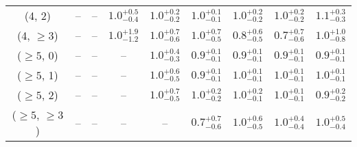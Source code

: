 \begin{table}[h!]
{\begin{tabular}{ccccccccc}
	(4, 2) & -- & -- & $1.0^{+ 0.5 }_{- 0.4 }$ & $1.0^{+ 0.2 }_{- 0.2 }$ & $1.0^{+ 0.1 }_{- 0.1 }$ & $1.0^{+ 0.2 }_{- 0.2 }$ & $1.0^{+ 0.2 }_{- 0.2 }$ & $1.1^{+ 0.3 }_{- 0.3 }$ \\[0.5ex] 
	(4, $\ge3$) & -- & -- & $1.0^{+ 1.9 }_{- 1.2 }$ & $1.0^{+ 0.7 }_{- 0.6 }$ & $1.0^{+ 0.7 }_{- 0.5 }$ & $0.8^{+ 0.6 }_{- 0.5 }$ & $0.7^{+ 0.7 }_{- 0.6 }$ & $1.0^{+ 1.0 }_{- 0.8 }$ \\[0.5ex] 
	($\ge5$, 0) & -- & -- & -- & $1.0^{+ 0.4 }_{- 0.3 }$ & $0.9^{+ 0.1 }_{- 0.1 }$ & $0.9^{+ 0.1 }_{- 0.1 }$ & $0.9^{+ 0.1 }_{- 0.1 }$ & $0.9^{+ 0.1 }_{- 0.1 }$ \\[0.5ex] 
	($\ge5$, 1) & -- & -- & -- & $1.0^{+ 0.6 }_{- 0.5 }$ & $0.9^{+ 0.1 }_{- 0.1 }$ & $1.0^{+ 0.1 }_{- 0.1 }$ & $1.0^{+ 0.1 }_{- 0.1 }$ & $1.0^{+ 0.1 }_{- 0.1 }$ \\[0.5ex] 
	($\ge5$, 2) & -- & -- & -- & $1.0^{+ 0.7 }_{- 0.5 }$ & $1.0^{+ 0.2 }_{- 0.2 }$ & $1.0^{+ 0.2 }_{- 0.1 }$ & $1.0^{+ 0.1 }_{- 0.1 }$ & $0.9^{+ 0.2 }_{- 0.2 }$ \\[0.5ex] 
	($\ge5$, $\ge3$) & -- & -- & -- & -- & $0.7^{+ 0.7 }_{- 0.6 }$ & $1.0^{+ 0.6 }_{- 0.5 }$ & $1.0^{+ 0.4 }_{- 0.4 }$ & $1.0^{+ 0.5 }_{- 0.4 }$ \\[0.5ex] 
	\hline
	\hline
\end{tabular}}
\end{table}
